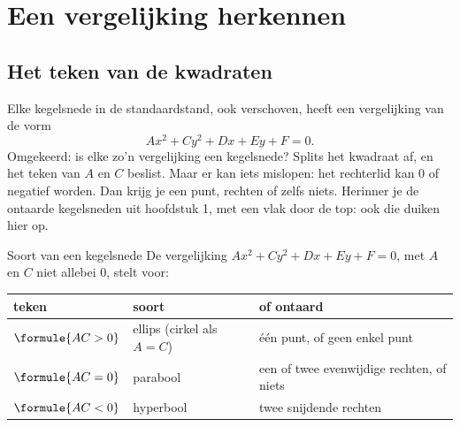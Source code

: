 
\begin{oefeningen}
\end{oefeningen}

\section{Een vergelijking herkennen}

\subsection{Het teken van de kwadraten}

Elke kegelsnede in de standaardstand, ook verschoven, heeft een vergelijking van de vorm
\[ Ax^2 + Cy^2 + Dx + Ey + F = 0 . \]
Omgekeerd: is elke zo'n vergelijking een kegelsnede? Splits het kwadraat af, en het teken van $A$ en $C$ beslist. Maar er kan iets mislopen: het rechterlid kan 0 of negatief worden. Dan krijg je een punt, rechten of zelfs niets. Herinner je de ontaarde kegelsneden uit hoofdstuk 1, met een vlak door de top: ook die duiken hier op.

\begin{theorie}
\begin{stelling}{Soort van een kegelsnede}
De vergelijking $Ax^2 + Cy^2 + Dx + Ey + F = 0$, met $A$ en $C$ niet allebei 0, stelt voor:

{\centering{}\renewcommand{\arraystretch}{1.6}%
\begin{tabular}{|>{\centering\arraybackslash}m{2.8cm}|>{\centering\arraybackslash}m{4.4cm}|>{\centering\arraybackslash}m{5.4cm}|}
\hline
\textbf{teken} & \textbf{soort} & \textbf{of ontaard} \\ \hline
$\formule{AC > 0}$ & ellips (cirkel als $A = C$) & één punt, of geen enkel punt \\ \hline
$\formule{AC = 0}$ & parabool & een of twee evenwijdige rechten, of niets \\ \hline
$\formule{AC < 0}$ & hyperbool & twee snijdende rechten \\ \hline
\end{tabular}\par}
\end{stelling}
\end{theorie}

